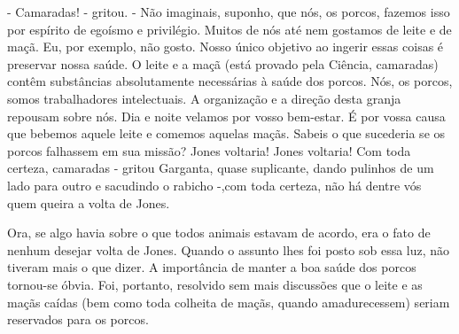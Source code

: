 - Camaradas! - gritou. - Não imaginais, suponho, que nós, os porcos, fazemos isso por espírito de
egoísmo e privilégio. Muitos de nós até nem gostamos de leite e de maçã. Eu, por exemplo, não gosto.
Nosso único objetivo ao ingerir essas coisas é preservar nossa saúde. O leite e a maçã (está provado pela
Ciência, camaradas) contêm substâncias absolutamente necessárias à saúde dos porcos. Nós, os porcos,
somos trabalhadores intelectuais. A organização e a direção desta granja repousam sobre nós. Dia e noite
velamos por vosso bem-estar. É por vossa causa que bebemos aquele leite e comemos aquelas maçãs.
Sabeis o que sucederia se os porcos falhassem em sua missão? Jones voltaria! Jones voltaria! Com toda
certeza, camaradas - gritou Garganta, quase suplicante, dando pulinhos de um lado para outro e
sacudindo o rabicho -,com toda certeza, não há dentre vós quem queira a volta de Jones.

Ora, se algo havia sobre o que todos animais estavam de acordo, era o fato de nenhum desejar volta de
Jones. Quando o assunto lhes foi posto sob essa luz, não tiveram mais o que dizer. A importância de
manter a boa saúde dos porcos tornou-se óbvia. Foi, portanto, resolvido sem mais discussões que o leite e
as maçãs caídas (bem como toda colheita de maçãs, quando amadurecessem) seriam reservados para os
porcos.



